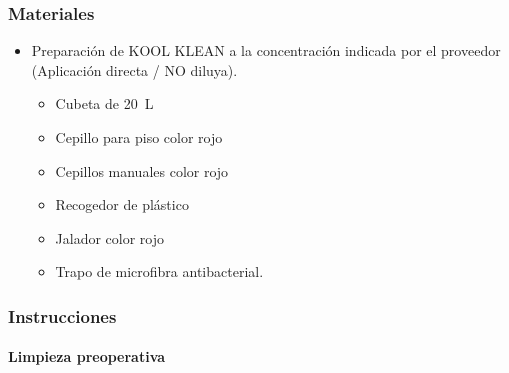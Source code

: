 \subsubsection{Materiales}
\begin{itemize}
    \item Preparación de KOOL KLEAN a la concentración indicada por el proveedor (Aplicación directa / NO diluya).
          \begin{itemize}
              \item Cubeta de \qty{20}{\liter}
              \item Cepillo para piso color rojo
              \item Cepillos manuales color rojo
              \item Recogedor de plástico
              \item Jalador color rojo
              \item Trapo de microfibra antibacterial.
          \end{itemize}
\end{itemize}

\subsubsection{Instrucciones}

\paragraph{Limpieza preoperativa}

